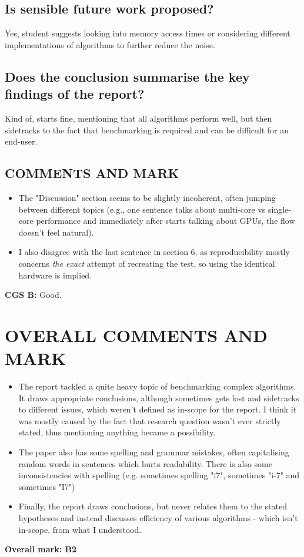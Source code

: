 \documentclass{article}
\begin{document}
\begin{normalsize}
\subsection{Is sensible future work proposed?}
Yes, student suggests looking into memory access times or considering different implementations of algorithms to further reduce the noise. 
\subsection{Does the conclusion summarise the key findings of the report?}
Kind of, starts fine, mentioning that all algorithms perform well, but then sidetracks to the fact that benchmarking is required and can be difficult for an end-user. 
\subsection{COMMENTS AND MARK}
\begin{itemize}
  \item The "Discussion" section seems to be slightly incoherent, often jumping between different topics (e.g., one sentence talks about multi-core vs single-core performance and immediately after starts talking about GPUs, the flow doesn't feel natural).
  \item I also disagree with the last sentence in section 6, as reproducibility mostly concerns \textit{the exact} attempt of recreating the test, so using the identical hardware is implied.
\end{itemize}
\textbf{CGS B: } Good.
\section{OVERALL COMMENTS AND MARK}
\begin{itemize}
  \item The report tackled a quite heavy topic of benchmarking complex algorithms. It draws appropriate conclusions, although sometimes gets lost and sidetracks to different issues, which weren't defined as in-scope for the report. I think it was mostly caused by the fact that research question wasn't ever strictly stated, thus mentioning anything became a possibility.
  \item The paper also has some spelling and grammar mistakes, often capitalising random words in sentences which hurts readability. There is also some inconsistencies with spelling (e.g. sometimes spelling "i7", sometimes "i-7" and sometimes "I7") 
  \item Finally, the report draws conclusions, but never relates them to the stated hypotheses and instead discusses efficiency of various algorithms - which isn't in-scope, from what I understood.
\end{itemize}
\textbf{Overall mark: B2}
\end{normalsize}
\end{document}
